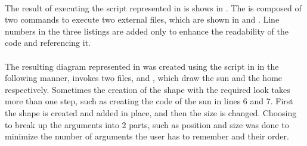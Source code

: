 \paragraph{}
The result of executing the script represented in  is shows in . The  is composed of two commands to execute two external files, which are shown in  and . Line numbers in the three listings are added only to enhance the readability of the code and referencing it.

\paragraph{}
The resulting diagram represented in  was created using the script in  in the following manner,  invokes two files,  and , which draw the sun and the home respectively. Sometimes the creation of the shape with the required look takes more than one step, such as creating the code of the sun in  lines 6 and 7. First the shape is created and added in place, and then the size is changed. Choosing to break up the arguments into 2 parts, such as position and size was done to minimize the number of arguments the user has to remember and their order.


